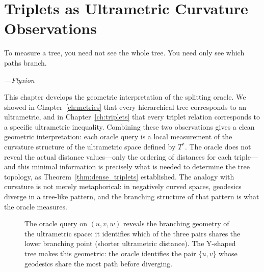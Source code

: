 \chapter{Triplets as Ultrametric Curvature Observations}
\label{ch:curvature}

\epigraph{%
  To measure a tree, you need not see the whole tree.
  You need only see which paths branch.%
}{\textit{---Flyxion}}

This chapter develops the geometric interpretation of the splitting oracle. We showed in Chapter~\ref{ch:metrics} that every hierarchical tree corresponds to an ultrametric, and in Chapter~\ref{ch:triplets} that every triplet relation corresponds to a specific ultrametric inequality. Combining these two observations gives a clean geometric interpretation: each oracle query is a local measurement of the curvature structure of the ultrametric space defined by $T^*$. The oracle does not reveal the actual distance values---only the ordering of distances for each triple---and this minimal information is precisely what is needed to determine the tree topology, as Theorem~\ref{thm:dense_triplets} established. The analogy with curvature is not merely metaphorical: in negatively curved spaces, geodesics diverge in a tree-like pattern, and the branching structure of that pattern is what the oracle measures.

\begin{figure}[ht]
\centering
{}
\caption{The oracle query on $(u,v,w)$ reveals the branching geometry of the ultrametric space: it identifies which of the three pairs shares the lower branching point (shorter ultrametric distance). The Y-shaped tree makes this geometric: the oracle identifies the pair $\{u,v\}$ whose geodesics share the most path before diverging.}
\label{fig:curvature}
\end{figure}

